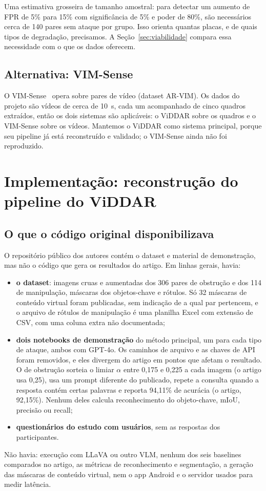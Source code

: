\documentclass[journal,onecolumn]{IEEEtran}
\begin{document}
Uma estimativa grosseira de tamanho amostral: para detectar um aumento de FPR de 5\% para 15\% com
significância de 5\% e poder de 80\%, são necessários cerca de 140 pares sem ataque por grupo. Isso
orienta quantas placas, e de quais tipos de degradação, precisamos. A Seção~\ref{sec:viabilidade}
compara essa necessidade com o que os dados oferecem.

\subsection{Alternativa: VIM-Sense}
O VIM-Sense~\cite{vimsense} opera sobre pares de vídeo (dataset AR-VIM). Os dados do projeto são
vídeos de cerca de 10~s, cada um acompanhado de cinco quadros extraídos, então os dois sistemas são
aplicáveis: o ViDDAR sobre os quadros e o VIM-Sense sobre os vídeos. Mantemos o ViDDAR como sistema
principal, porque seu pipeline já está reconstruído e validado; o VIM-Sense ainda não foi
reproduzido.

\section{Implementação: reconstrução do pipeline do ViDDAR}
\label{sec:impl}

\subsection{O que o código original disponibilizava}
O repositório público dos autores contém o dataset e material de demonstração, mas não o código que
gera os resultados do artigo. Em linhas gerais, havia:
\begin{itemize}
\item \textbf{o dataset}: imagens cruas e aumentadas dos 306 pares de obstrução e dos 114 de
  manipulação, máscaras dos objetos-chave e rótulos. Só 32 máscaras de conteúdo virtual foram
  publicadas, sem indicação de a qual par pertencem, e o arquivo de rótulos de manipulação é uma
  planilha Excel com extensão de CSV, com uma coluna extra não documentada;
\item \textbf{dois notebooks de demonstração} do método principal, um para cada tipo de ataque, ambos
  com GPT-4o. Os caminhos de arquivo e as chaves de API foram removidos, e eles divergem do artigo em
  pontos que afetam o resultado. O de obstrução sorteia o limiar $\alpha$ entre 0,175 e 0,225 a cada
  imagem (o artigo usa 0,25), usa um prompt diferente do publicado, repete a consulta quando a
  resposta contém certas palavras e reporta 94,11\% de acurácia (o artigo, 92,15\%). Nenhum deles
  calcula reconhecimento do objeto-chave, mIoU, precisão ou recall;
\item \textbf{questionários do estudo com usuários}, sem as respostas dos participantes.
\end{itemize}
Não havia: execução com LLaVA ou outro VLM, nenhum dos seis baselines comparados no artigo, as
métricas de reconhecimento e segmentação, a geração das máscaras de conteúdo virtual, nem o app
Android e o servidor usados para medir latência.
\end{document}

